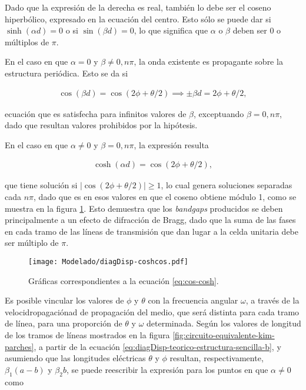Dado que la expresión de la derecha es real, también lo debe ser el coseno hiperbólico, expresado en la ecuación del centro. Esto sólo se puede dar si $\sinh(\alpha d) = 0$ o si $\sin(\beta d) = 0$, lo que significa que $\alpha$ o $\beta$ deben ser $0$ o múltiplos de $\pi$.

En el caso en que $\alpha = 0$ y $\beta \neq 0,n\pi$, la onda existente es propagante sobre la estructura periódica. Esto se da si

\begin{align}
	\label{eq:diagDisp-teorico-estructura-sencilla-b}
	\cos(\beta d) = \cos(2\phi + \theta/2) \implies \pm \beta d = 2\phi + \theta/2,
\end{align}

ecuación que es satisfecha para infinitos valores de $\beta$, exceptuando $\beta=0,n\pi$, dado que resultan valores prohibidos por la hipótesis.

En el caso en que $\alpha \neq 0$ y $\beta = 0,n\pi$, la expresión resulta

\begin{align}
\label{eq:cos-cosh}
\cosh(\alpha d) = \cos(2\phi + \theta/2),
\end{align}

que tiene solución si $|\cos(2\phi + \theta/2)| \geq 1$, lo cual genera soluciones separadas cada $n\pi$, dado que es en esos valores en que el coseno obtiene módulo 1, como se muestra en la figura \ref{fig:solucion-cos-cosh}. Esto demuestra que los \textit{bandgaps} producidos se deben principalmente a un efecto de difracción de Bragg, dado que la suma de las fases en cada tramo de las líneas de transmisión que dan lugar a la celda unitaria debe ser múltiplo de $\pi$.

\begin{figure}[h]
	\centering
	\texttt{[image: Modelado/diagDisp-coshcos.pdf]}
	\caption{Gráficas correspondientes a la ecuación \ref{eq:cos-cosh}.}
	\label{fig:solucion-cos-cosh}
\end{figure}

Es posible vincular los valores de $\phi$ y $\theta$ con la frecuencia angular $\omega$, a través de la velocidropagaciónad de propagación del medio, que será distinta para cada tramo de línea, para una proporción de $\theta$ y $\omega$ determinada. Según los valores de longitud de los tramos de líneas mostrados en la figura \ref{fig:circuito-equivalente-kim-parches}, a partir de la ecuación \ref{eq:diagDisp-teorico-estructura-sencilla-b}, y asumiendo que las longitudes eléctricas $\theta$ y $\phi$ resultan, respectivamente, $\beta_1 (a-b)$ y $\beta_2 b$, se puede reescribir la expresión para los puntos en que $\alpha\neq 0$ como

